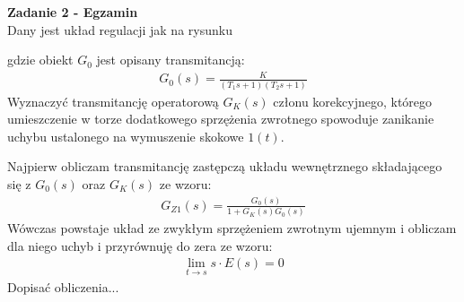 \documentclass[a4paper,11pt]{article}
\begin{document}
\newpage
\begin{framed}
\textbf{Zadanie 2 - Egzamin} \\ 
Dany jest układ regulacji jak na rysunku
\begin{figure}[H]
\begin{center}
\end{center}
\end{figure}

gdzie obiekt \( G_0\) jest opisany transmitancją:
\begin{align*}
G_0(s)=\frac{K}{(T_1s+1)(T_2s+1)}
\end{align*}
Wyznaczyć transmitancję operatorową \( G_K(s) \) członu korekcyjnego, którego umieszczenie w torze dodatkowego sprzężenia zwrotnego spowoduje zanikanie uchybu ustalonego na wymuszenie skokowe \( 1(t) \). 
\end{framed}
Najpierw obliczam transmitancję zastępczą układu wewnętrznego składającego się z \( G_0(s) \) oraz \( G_K(s) \) ze wzoru:
\begin{align*}
G_{Z1}(s)=\frac{G_0(s)}{1+G_K(s)G_0(s)}
\end{align*}
Wówczas powstaje układ ze zwykłym sprzężeniem zwrotnym ujemnym i obliczam dla niego uchyb i przyrównuję do zera ze wzoru:
\begin{align*}
\lim_{t\rightarrow s } s\cdot E(s) = 0
\end{align*}
Dopisać obliczenia...
\end{document}
